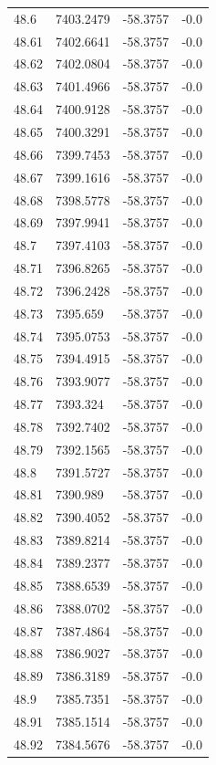 \begin{table}[H]
\begin{tabular}{llll}
48.6 & 7403.2479 & -58.3757 & -0.0 \\
48.61 & 7402.6641 & -58.3757 & -0.0 \\
48.62 & 7402.0804 & -58.3757 & -0.0 \\
48.63 & 7401.4966 & -58.3757 & -0.0 \\
48.64 & 7400.9128 & -58.3757 & -0.0 \\
48.65 & 7400.3291 & -58.3757 & -0.0 \\
48.66 & 7399.7453 & -58.3757 & -0.0 \\
48.67 & 7399.1616 & -58.3757 & -0.0 \\
48.68 & 7398.5778 & -58.3757 & -0.0 \\
48.69 & 7397.9941 & -58.3757 & -0.0 \\
48.7 & 7397.4103 & -58.3757 & -0.0 \\
48.71 & 7396.8265 & -58.3757 & -0.0 \\
48.72 & 7396.2428 & -58.3757 & -0.0 \\
48.73 & 7395.659 & -58.3757 & -0.0 \\
48.74 & 7395.0753 & -58.3757 & -0.0 \\
48.75 & 7394.4915 & -58.3757 & -0.0 \\
48.76 & 7393.9077 & -58.3757 & -0.0 \\
48.77 & 7393.324 & -58.3757 & -0.0 \\
48.78 & 7392.7402 & -58.3757 & -0.0 \\
48.79 & 7392.1565 & -58.3757 & -0.0 \\
48.8 & 7391.5727 & -58.3757 & -0.0 \\
48.81 & 7390.989 & -58.3757 & -0.0 \\
48.82 & 7390.4052 & -58.3757 & -0.0 \\
48.83 & 7389.8214 & -58.3757 & -0.0 \\
48.84 & 7389.2377 & -58.3757 & -0.0 \\
48.85 & 7388.6539 & -58.3757 & -0.0 \\
48.86 & 7388.0702 & -58.3757 & -0.0 \\
48.87 & 7387.4864 & -58.3757 & -0.0 \\
48.88 & 7386.9027 & -58.3757 & -0.0 \\
48.89 & 7386.3189 & -58.3757 & -0.0 \\
48.9 & 7385.7351 & -58.3757 & -0.0 \\
48.91 & 7385.1514 & -58.3757 & -0.0 \\
48.92 & 7384.5676 & -58.3757 & -0.0 \\

\end{tabular}
\end{table}
